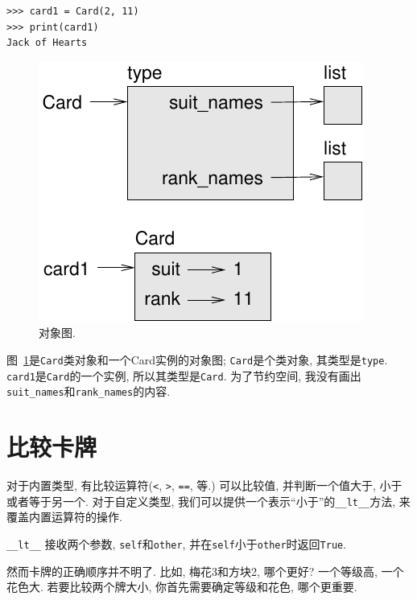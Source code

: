 \documentclass[10pt]{book}
\begin{document}
\begin{verbatim}
>>> card1 = Card(2, 11)
>>> print(card1)
Jack of Hearts
\end{verbatim}

\begin{figure}
\centerline
{\includegraphics[scale=0.8]{figs/card1.pdf}}
\caption{对象图.}
\label{fig.card1}
\end{figure}

图~\ref{fig.card1}是{\tt Card}类对象和一个Card实例的对象图;
{\tt Card}是个类对象, 其类型是{\tt type}.  
{\tt card1}是{\tt Card}的一个实例, 
所以其类型是{\tt Card}.
为了节约空间, 我没有画出\verb"suit_names"和\verb"rank_names"的内容. 
  


\section{比较卡牌}
\label{comparecard}

对于内置类型, 有比较运算符({\tt <}, {\tt >}, {\tt ==}, 等.)
可以比较值, 并判断一个值大于, 小于或者等于另一个. 
对于自定义类型, 我们可以提供一个表示``小于''的\verb"__lt__"方法, 
来覆盖内置运算符的操作. 

\verb"__lt__" 接收两个参数, {\tt self}和{\tt other},
并在{\tt self}小于{\tt other}时返回{\tt True}.

然而卡牌的正确顺序并不明了. 
比如, 梅花3和方块2, 哪个更好?
一个等级高, 一个花色大. 
若要比较两个牌大小, 你首先需要确定等级和花色, 哪个更重要. 
\end{document}
